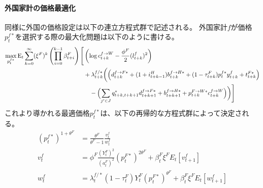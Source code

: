 \paragraph{外国家計の価格最適化}
\label{sec:model_producers_optimization_foreign}
同様に外国の価格設定は以下の連立方程式群で記述される。
外国家計\(f\)が価格\(p_t^{f*}\)を選択する際の最大化問題は以下のように書ける。
\begin{equation}
\label{form:model_producers_optimization_foreign_lagrangian_def}
    \begin{aligned}
        \max_{p_t^{f*}}\operatorname{E}_t\sum_{k=0}^{\infty}(\xi^F)^k\left(\prod_{i=0}^{k-1}\beta_{t+i}^F\right)\Biggl[&\left(\log c_{t+k}^{f\to W}-\frac{\phi^F}{2}(l_{t+k}^f)^2\right) \\
        &+\lambda_{t+k}^{f/*}\biggl(\Bigl(d_{t+k}^{f\to F*}+(1+i_{t+k-1}^H)b_{t+k}^{f\to H*}+(1-\tau_{t+k}^F)p_t^{f*}y_{t+k}^f+t_{t+k}^{F*}\Bigr) \\
        &\quad-\Bigl(\sum_{j'\in J}q_{t+k,t+k+1}^*d_{t+k+1}^{f\to F*}+b_{t+k+1}^{f\to H*}+p_{t+k}^{F\to W*}c_{t+k}^{f\to W}\Bigr)\biggr)\Biggr]
    \end{aligned}
\end{equation}
これより導かれる最適価格\(p_t^{f*}\)は、以下の再帰的な方程式群によって決定される。
\begin{align}
    \label{form:model_producers_optimization_foreign_p_f_star}
        (p_t^{f*})^{1+\theta^F}&=\frac{\theta^F}{\theta^F-1}\frac{v_t^f}{w_t^f} \\
    \label{form:model_producers_optimization_foreign_v_f}
        v_t^f&=\phi^F\frac{(Y_t^F)^2}{(a_t^F)^2}(p_t^{F*})^{2\theta^F}+\beta_t^F\xi^FE_t[v_{t+1}^f] \\
    \label{form:model_producers_optimization_foreign_w_f}
        w_t^f&=\lambda_t^{f/*}(1-\tau_t^F)Y_t^F(p_t^{F*})^{\theta^F}+\beta_t^F\xi^FE_t[w_{t+1}^f]
\end{align}